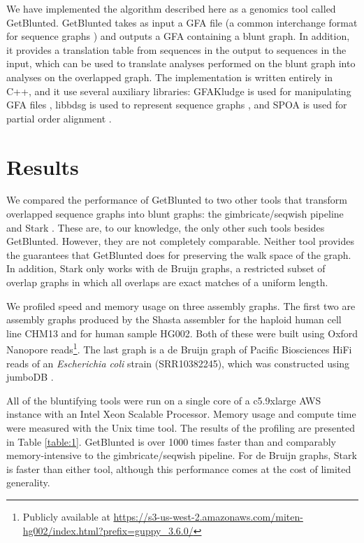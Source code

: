 \documentclass[11pt]{ucthesis}
\begin{document}
We have implemented the algorithm described here as a genomics tool called GetBlunted.
GetBlunted takes as input a GFA file (a common interchange format for sequence graphs \cite{gfaspec}) and outputs a GFA containing a blunt graph.
In addition, it provides a translation table from sequences in the output to sequences in the input, which can be used to translate analyses performed on the blunt graph into analyses on the overlapped graph.
The implementation is written entirely in C++, and it use several auxiliary libraries: GFAKludge is used for manipulating GFA files \cite{dawson2019gfakluge}, libbdsg is used to represent sequence graphs \cite{eizenga2020efficient}, and SPOA is used for partial order alignment \cite{vaser2017fast}.

\section{Results}


We compared the performance of GetBlunted to two other tools that transform overlapped sequence graphs into blunt graphs: the gimbricate/seqwish \cite{garrison_ekggimbricate_2020,garrison_ekgseqwish_2021} pipeline and Stark \cite{nikaein_hnikaeinstark_2021}. 
These are, to our knowledge, the only other such tools besides GetBlunted.
However, they are not completely comparable.
Neither tool provides the guarantees that GetBlunted does for preserving the walk space of the graph.
In addition, Stark only works with de Bruijn graphs, a restricted subset of overlap graphs in which all overlaps are exact matches of a uniform length.

We profiled speed and memory usage on three assembly graphs.
The first two are assembly graphs produced by the Shasta assembler \cite{shafin_nanopore_2020} for the haploid human cell line CHM13 and for human sample HG002.
Both of these were built using Oxford Nanopore reads\footnote{Publicly available at \url{https://s3-us-west-2.amazonaws.com/miten-hg002/index.html?prefix=guppy\_3.6.0/}}.
The last graph is a de Bruijn graph of Pacific Biosciences HiFi reads of an \textit{Escherichia coli} strain (SRR10382245), which was constructed using jumboDB \cite{bankevich_assembling_2020}.

All of the bluntifying tools were run on a single core of a c5.9xlarge AWS instance with an Intel Xeon Scalable Processor.
Memory usage and compute time were measured with the Unix time tool.
The results of the profiling are presented in Table \ref{table:1}.
GetBlunted is over 1000 times faster than and comparably memory-intensive to the gimbricate/seqwish pipeline. 
For de Bruijn graphs, Stark is faster than either tool, although this performance comes at the cost of limited generality.
\end{document}
